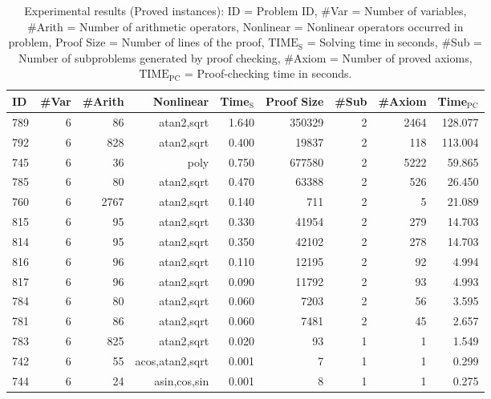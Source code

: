 \documentclass[10pt]{article}
\theoremstyle{definition}
\begin{document}
\begin{table}[h!]
  \begin{center}
\small
\begin{tabular}{|l||r|r|r||r|r|r|r|r|}
\hline
ID & \#Var & \#Arith & Nonlinear & Time$_{\text{S}}$ & Proof Size & \#Sub & \#Axiom & Time$_{\text{PC}}$ \\
\hline
\hline
789 & 6 & 86 & atan2,sqrt & 1.640 & 350329 & 2 & 2464 & 128.077 \\
\hline
792 & 6 & 828 & atan2,sqrt & 0.400 & 19837 & 2 & 118 & 113.004 \\
\hline
745 & 6 & 36 & poly & 0.750 & 677580 & 2 & 5222 & 59.865 \\
\hline
785 & 6 & 80 & atan2,sqrt & 0.470 & 63388 & 2 & 526 & 26.450 \\
\hline
760 & 6 & 2767 & atan2,sqrt & 0.140 & 711 & 2 & 5 & 21.089 \\
\hline
815 & 6 & 95 & atan2,sqrt & 0.330 & 41954 & 2 & 279 & 14.703 \\
\hline
814 & 6 & 95 & atan2,sqrt & 0.350 & 42102 & 2 & 278 & 14.703 \\
\hline
816 & 6 & 96 & atan2,sqrt & 0.110 & 12195 & 2 & 92 & 4.994 \\
\hline
817 & 6 & 96 & atan2,sqrt & 0.090 & 11792 & 2 & 93 & 4.993 \\
\hline
784 & 6 & 80 & atan2,sqrt & 0.060 & 7203 & 2 & 56 & 3.595 \\
\hline
781 & 6 & 86 & atan2,sqrt & 0.060 & 7481 & 2 & 45 & 2.657 \\
\hline
783 & 6 & 825 &atan2,sqrt & 0.020 & 93 & 1 & 1 & 1.549 \\
\hline
742 & 6 & 55 & acos,atan2,sqrt & 0.001 & 7 & 1 & 1 & 0.299 \\
\hline
744 & 6 & 24 & asin,cos,sin & 0.001 & 8 & 1 & 1 & 0.275\\
\hline
\end{tabular}
  \end{center}
  \caption{
    Experimental results (Proved instances):
    ID = Problem ID,
    \#Var = Number of variables,
    \#Arith = Number of arithmetic operators,
    Nonlinear = Nonlinear operators occurred in problem,
    Proof Size = Number of lines of the proof,
    $\mathrm{TIME_S}$ = Solving time in seconds,
    \#Sub = Number of subproblems generated by proof checking,
    \#Axiom = Number of proved axioms,
    $\mathrm{TIME_{PC}}$ = Proof-checking time in seconds.
  }\label{tbl:exp}
  \vspace{-1cm}
\end{table}
\end{document}
